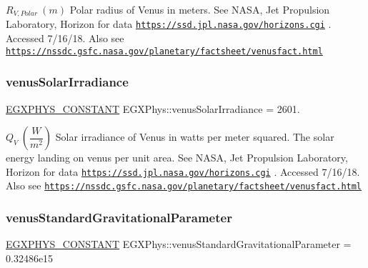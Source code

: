 $R_{V,Polar} \ (m)$ Polar radius of Venus in meters. See N\+A\+SA, Jet Propulsion Laboratory, Horizon for data \href{https://ssd.jpl.nasa.gov/horizons.cgi}{\tt https\+://ssd.\+jpl.\+nasa.\+gov/horizons.\+cgi} . Accessed 7/16/18. Also see \href{https://nssdc.gsfc.nasa.gov/planetary/factsheet/venusfact.html}{\tt https\+://nssdc.\+gsfc.\+nasa.\+gov/planetary/factsheet/venusfact.\+html} \mbox{\label{group___e_g_x_phys-_constants-_astrophysics-_solar_system-_venus-_bulk_ga9c4ac12c5a1974a8d2b2308db550aaa3}} 
\subsubsection{\texorpdfstring{venus\+Solar\+Irradiance}{venusSolarIrradiance}}
{\footnotesize\ttfamily \mbox{\hyperlink{group___e_g_x_phys-_constants-_macros_ga76980d288494ce1714c9ac68a95ba702}{E\+G\+X\+P\+H\+Y\+S\+\_\+\+C\+O\+N\+S\+T\+A\+NT}} E\+G\+X\+Phys\+::venus\+Solar\+Irradiance = 2601.}

$ Q_{V} \ (\dfrac{W}{m^2})$ Solar irradiance of Venus in watts per meter squared. The solar energy landing on venus per unit area. See N\+A\+SA, Jet Propulsion Laboratory, Horizon for data \href{https://ssd.jpl.nasa.gov/horizons.cgi}{\tt https\+://ssd.\+jpl.\+nasa.\+gov/horizons.\+cgi} . Accessed 7/16/18. Also see \href{https://nssdc.gsfc.nasa.gov/planetary/factsheet/venusfact.html}{\tt https\+://nssdc.\+gsfc.\+nasa.\+gov/planetary/factsheet/venusfact.\+html} \mbox{\label{group___e_g_x_phys-_constants-_astrophysics-_solar_system-_venus-_bulk_gab8f68b7d2d7e54c1da07518e14d91da1}} 
\subsubsection{\texorpdfstring{venus\+Standard\+Gravitational\+Parameter}{venusStandardGravitationalParameter}}
{\footnotesize\ttfamily \mbox{\hyperlink{group___e_g_x_phys-_constants-_macros_ga76980d288494ce1714c9ac68a95ba702}{E\+G\+X\+P\+H\+Y\+S\+\_\+\+C\+O\+N\+S\+T\+A\+NT}} E\+G\+X\+Phys\+::venus\+Standard\+Gravitational\+Parameter = 0.\+32486e15}

